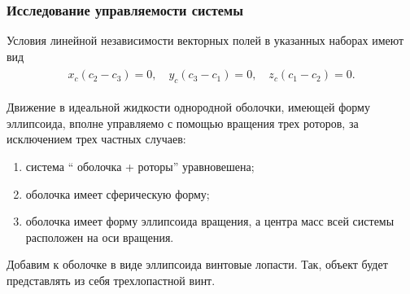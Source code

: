 \begin{frame}
\frametitle{Исследование управляемости системы}

Условия линейной независимости векторных полей в указанных наборах имеют вид
\begin{gather*}
\begin{gathered}
x_c(c_2 - c_3) = 0,\quad
y_c(c_3-c_1) = 0, \quad
z_c(c_1-c_2) = 0.
\end{gathered}
\end{gather*}

Движение в идеальной жидкости однородной оболочки, имеющей форму эллипсоида, вполне управляемо с помощью вращения трех роторов, за исключением трех частных случаев:
\begin{enumerate}
	\item система “ оболочка + роторы” уравновешена;
	\item оболочка имеет сферическую форму;
	\item оболочка имеет форму эллипсоида вращения, а центра масс всей системы	расположен на оси вращения.
\end{enumerate}

Добавим к оболочке в виде эллипсоида винтовые лопасти. Так, объект будет представлять из себя трехлопастной винт.

\end{frame}



